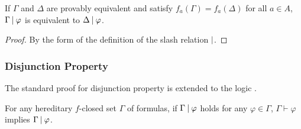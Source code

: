 \begin{lemma}
 \label{equiv}
 If $\Gamma$ and $\Delta$ are provably equivalent and satisfy
 $f_a(\Gamma) = f_a(\Delta)$ for all $a\in A$,
 $\Gamma\mathbin{\mid}\varphi$ is equivalent to $\Delta\mathbin{\mid}\varphi$.
\end{lemma}
\begin{proof}
 By the form of the definition of the slash relation $\mathbin{\mid}$.
\end{proof}

\subsubsection{Disjunction Property}

The standard proof for disjunction property is extended to the logic \iec.

\begin{theorem}
\label{slashcomp}
For any hereditary $f$-closed set $\Gamma$ of formulas, 
 if $\Gamma\mathbin{\mid}\varphi$ holds for any $\varphi \in \Gamma$\kern -1pt,
 $\Gamma\vdash\varphi$ implies $\Gamma\mathbin{\mid}\varphi$.
\end{theorem}
